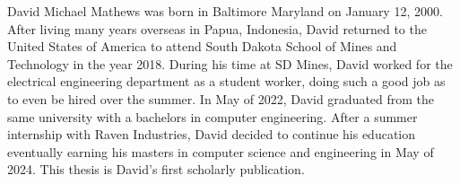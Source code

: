 \documentclass[12pt]{thesis}
\begin{document}
\begin{vita}

David Michael Mathews was born in Baltimore Maryland on January 12, 2000. After living many years overseas in Papua, Indonesia, David returned to the United States of America to attend South Dakota School of Mines and Technology in the year 2018. During his time at SD Mines, David worked for the electrical engineering department as a student worker, doing such a good job as to even be hired over the summer. In May of 2022, David graduated from the same university with a bachelors in computer engineering. After a summer internship with Raven Industries, David decided to continue his education eventually earning his masters in computer science and engineering in May of 2024. This thesis is David's first scholarly publication.
%  
%
%
%
%
%
%
%
%  

\end{vita}
%
%
\end{document}
